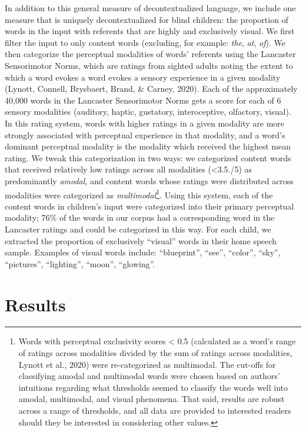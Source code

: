 \documentclass[
  man,floatsintext]{apa6}
\begin{document}
In addition to this general measure of decontextualized language, we include one measure that is uniquely decontextualized for blind children: the proportion of words in the input with referents that are highly and exclusively visual. We first filter the input to only content words (excluding, for example: \emph{the}, \emph{at}, \emph{of}). We then categorize the perceptual modalities of words' referents using the Lancaster Sensorimotor Norms, which are ratings from sighted adults noting the extent to which a word evokes a word evokes a sensory experience in a given modality (Lynott, Connell, Brysbaert, Brand, \& Carney, 2020). Each of the approximately 40,000 words in the Lancaster Sensorimotor Norms gets a score for each of 6 sensory modalities (auditory, haptic, gustatory, interoceptive, olfactory, visual). In this rating system, words with higher ratings in a given modality are more strongly associated with perceptual experience in that modality, and a word's dominant perceptual modality is the modality which received the highest mean rating. We tweak this categorization in two ways: we categorized content words that received relatively low ratings across all modalities (\textless3.5./5) as predominantly \emph{amodal}, and content words whose ratings were distributed across modalities were categorized as \emph{multimodal}\footnote{Words with perceptual exclusivity scores \textless{} 0.5 (calculated as a word's range of ratings across modalities divided by the sum of ratings across modalities, Lynott et al., 2020) were re-categorized as multimodal. The cut-offs for classifying amodal and multimodal words were chosen based on authors' intuitions regarding what thresholds seemed to classify the words well into amodal, multimodal, and visual phenomena. That said, results are robust across a range of thresholds, and all data are provided to interested readers should they be interested in considering other values.}. Using this system, each of the content words in children's input were categorized into their primary perceptual modality; 76\% of the words in our corpus had a corresponding word in the Lancaster ratings and could be categorized in this way. For each child, we extracted the proportion of exclusively ``visual'' words in their home speech sample. Examples of visual words include: ``blueprint'', ``see'', ``color'', ``sky'', ``pictures'', ``lighting'', ``moon'', ``glowing''.

\hypertarget{results}{%
\section{Results}\label{results}}
\end{document}
